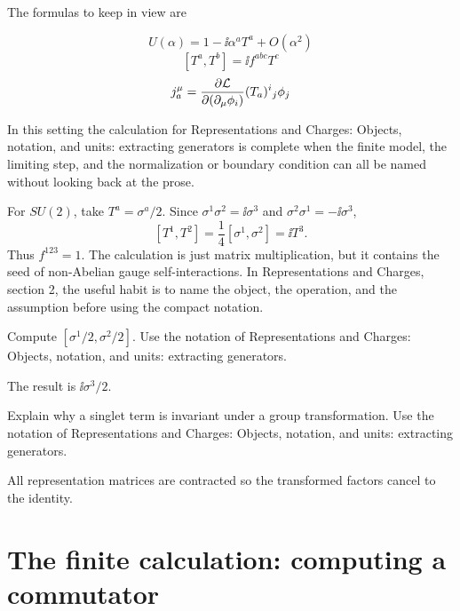 The formulas to keep in view are

\[
  U(\alpha)=1-\ii\alpha^aT^a+O(\alpha^2)
\]
\[
  [T^a,T^b]=\ii f^{abc}T^c
\]
\[
  j^\mu_a=\frac{\partial\mathcal L}{\partial(\partial_\mu\phi_i)}(T_a)^i{}_j\phi_j
\]

In this setting the calculation for Representations and Charges: Objects, notation, and units: extracting generators is complete when the finite model, the limiting step, and the normalization or boundary condition can all be named without looking back at the prose.




\begin{example}
For \(SU(2)\), take \(T^a=\sigma^a/2\).  Since \(\sigma^1\sigma^2=\ii\sigma^3\) and \(\sigma^2\sigma^1=-\ii\sigma^3\),
\[
  [T^1,T^2]=\frac14[\sigma^1,\sigma^2]=\ii T^3.
\]
Thus \(f^{123}=1\).  The calculation is just matrix multiplication, but it contains the seed of non-Abelian gauge self-interactions.  In Representations and Charges, section 2, the useful habit is to name the object, the operation, and the assumption before using the compact notation.
\end{example}



\begin{exercise}
Compute \([\sigma^1/2,\sigma^2/2]\).  Use the notation of Representations and Charges: Objects, notation, and units: extracting generators.
\begin{answer}
The result is \(\ii\sigma^3/2\).
\end{answer}
\end{exercise}

\begin{exercise}
Explain why a singlet term is invariant under a group transformation.  Use the notation of Representations and Charges: Objects, notation, and units: extracting generators.
\begin{answer}
All representation matrices are contracted so the transformed factors cancel to the identity.
\end{answer}
\end{exercise}



\section{The finite calculation: computing a commutator}

